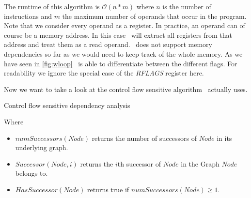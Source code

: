 The runtime of this algorithm is $\mathcal{O}(n*m)$ where $n$ is the number of instructions and $m$ the maximum number of operands that occur in the program.\\

Note that we consider every operand as a register. In practice, an operand can of course be a memory address. In this case \suaca\ will extract all registers from that address and treat them as a read operand. \suaca\ does not support memory dependencies so far as we would need to keep track of the whole memory. As we have seen in \autoref{fig:wloop} \suaca\ is able to differentiate between the different flags. For readability we ignore the special case of the \emph{RFLAGS} register here.

Now we want to take a look at the control flow sensitive algorithm \suaca\ actually uses. 
\newpage

\begin{algorithm}[H]
    \SetAlgoLined
    \caption{Control flow sensitive dependency analysis}
    \label{alg:dep}
\end{algorithm}

Where
\begin{itemize}
    \item $numSuccessors(Node)$ returns the number of successors of $Node$ in its underlying graph.
    \item $Successor(Node, i)$ returns the $i$th successor of $Node$ in the Graph $Node$ belongs to.
    \item $HasSuccessor(Node)$ returns true if $numSuccessors(Node) \geq 1$.
\end{itemize}

